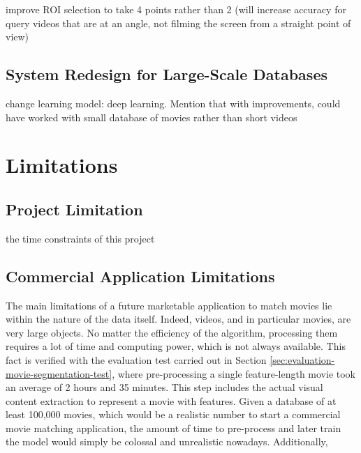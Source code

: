 improve ROI selection to take 4 points rather than 2 (will increase accuracy for query videos that are at an angle, not filming the screen from a straight point of view)

\subsection{System Redesign for Large-Scale Databases}

change learning model: deep learning. Mention that with improvements, could have worked with small database of movies rather than short videos

% 


\section{Limitations}

\subsection{Project Limitation}

the time constraints of this project

\subsection{Commercial Application Limitations}

The main limitations of a future marketable application to match movies lie within the nature of the data itself. Indeed, videos, and in particular movies, are very large objects. No matter the efficiency of the algorithm, processing them requires a lot of time and computing power, which is not always available. This fact is verified with the evaluation test carried out in Section \ref{sec:evaluation-movie-segmentation-test}, where pre-processing a single feature-length movie took an average of 2 hours and 35 minutes. This step includes the actual visual content extraction to represent a movie with features. Given a database of at least 100,000 movies, which would be a realistic number to start a commercial movie matching application, the amount of time to pre-process and later train the model would simply be colossal and unrealistic nowadays. Additionally, 

